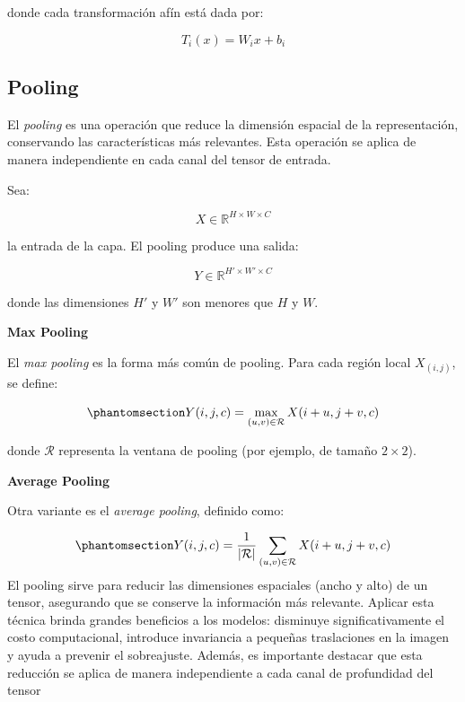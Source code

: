 \documentclass[
  spanish,
  us-letterpaper,
  DIV=11,
  numbers=noendperiod]{scrreprt}
\begin{document}
donde cada transformación afín está dada por:

\[
T_i(x) = W_i x + b_i
\]

\subsection{Pooling}\label{pooling}

El \emph{pooling} es una operación que reduce la dimensión espacial de
la representación, conservando las características más relevantes. Esta
operación se aplica de manera independiente en cada canal del tensor de
entrada.

Sea:

\[
X \in \mathbb{R}^{H \times W \times C}
\]

la entrada de la capa. El pooling produce una salida:

\[
Y \in \mathbb{R}^{H' \times W' \times C}
\]

donde las dimensiones \(H'\) y \(W'\) son menores que \(H\) y \(W\).

\textbf{Max Pooling}

El \emph{max pooling} es la forma más común de pooling. Para cada región
local \(X_{(i,j)}\), se define:

\begin{equation}\phantomsection\label{eq-maxpool}{
Y(i,j,c) = \max_{(u,v) \in \mathcal{R}} X(i+u, j+v, c)
}\end{equation}

donde \(\mathcal{R}\) representa la ventana de pooling (por ejemplo, de
tamaño \(2 \times 2\)).

\textbf{Average Pooling}

Otra variante es el \emph{average pooling}, definido como:

\begin{equation}\phantomsection\label{eq-avgpool}{
Y(i,j,c) = \frac{1}{|\mathcal{R}|} \sum_{(u,v) \in \mathcal{R}} X(i+u, j+v, c)
}\end{equation} El pooling sirve para reducir las dimensiones espaciales
(ancho y alto) de un tensor, asegurando que se conserve la información
más relevante. Aplicar esta técnica brinda grandes beneficios a los
modelos: disminuye significativamente el costo computacional, introduce
invariancia a pequeñas traslaciones en la imagen y ayuda a prevenir el
sobreajuste. Además, es importante destacar que esta reducción se aplica
de manera independiente a cada canal de profundidad del tensor
\end{document}
